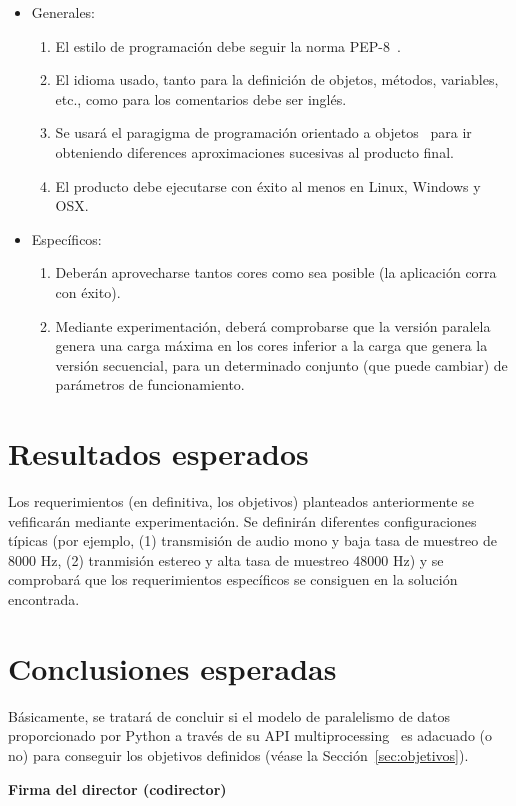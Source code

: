 \documentclass[titlepage, 12pt, a4paper, oneside]{article}
\begin{document}
\begin{itemize}
\item Generales:
  \begin{enumerate}
  \item El estilo de programación debe seguir la norma
    PEP-8~\cite{PEP8}.
  \item El idioma usado, tanto para la definición de objetos, métodos,
    variables, etc., como para los comentarios debe ser inglés.
  \item Se usará el paragigma de programación orientado a
    objetos~\cite{schach2008object} para ir obteniendo diferences
    aproximaciones sucesivas al producto final.
  \item El producto debe ejecutarse con éxito al menos en Linux,
    Windows y OSX.
  \end{enumerate}
\item Específicos:
  \begin{enumerate}
  \item Deberán aprovecharse tantos cores como sea posible (la
    aplicación corra con éxito).
  \item Mediante experimentación, deberá comprobarse que la versión
    paralela genera una carga máxima en los cores inferior a la carga
    que genera la versión secuencial, para un determinado conjunto
    (que puede cambiar) de parámetros de funcionamiento.
  \end{enumerate}
\end{itemize}

\section{Resultados esperados}
Los requerimientos (en definitiva, los objetivos) planteados
anteriormente se vefificarán mediante experimentación.  Se definirán
diferentes configuraciones típicas (por ejemplo, (1) transmisión de
audio mono y baja tasa de muestreo de 8000 Hz, (2) tranmisión estereo
y alta tasa de muestreo 48000 Hz) y se comprobará que los
requerimientos específicos se consiguen en la solución encontrada.

\section{Conclusiones esperadas}
Básicamente, se tratará de concluir si el modelo de paralelismo de
datos proporcionado por Python a través de su API
multiprocessing~\cite{multiprocessing} es adacuado (o no) para
conseguir los objetivos definidos (véase la
Sección~\ref{sec:objetivos}).




\begin{center}
  \textbf{Firma del director (codirector)}
\end{center}
\end{document}
